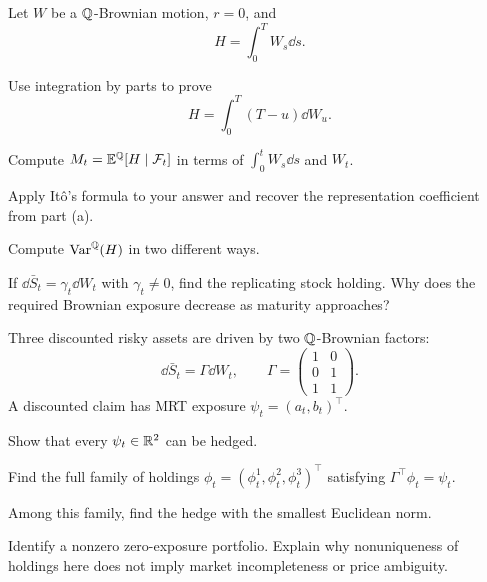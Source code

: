 \begin{exercise}
Let \(W\) be a \(\mathbb Q\)-Brownian motion, \(r=0\), and
\[
H=\int_0^T W_s\dd s.
\]
\begin{exparts}
  \item Use integration by parts to prove
  \[
  H=\int_0^T(T-u)\dd W_u.
  \]
  \item Compute \(M_t=\mathbb E^{\mathbb Q}[H\mid\mathcal F_t]\) in terms of
  \(\int_0^tW_s\dd s\) and \(W_t\).
  \item Apply It\^o's formula to your answer and recover the representation
  coefficient from part (a).
  \item Compute \(\operatorname{Var}^{\mathbb Q}(H)\) in two different ways.
  \item If \(\dd\bar S_t=\gamma_t\dd W_t\) with \(\gamma_t\neq0\), find the
  replicating stock holding. Why does the required Brownian exposure decrease as maturity
  approaches?
\end{exparts}
\end{exercise}

\begin{exercise}
Three discounted risky assets are driven by two \(\mathbb Q\)-Brownian factors:
\[
\dd\bar S_t=\Gamma\dd W_t,
\qquad
\Gamma=
\begin{pmatrix}
1&0\\
0&1\\
1&1
\end{pmatrix}.
\]
A discounted claim has MRT exposure
\(\psi_t=(a_t,b_t)^\top\).
\begin{exparts}
  \item Show that every \(\psi_t\in\mathbb{R}^2\) can be hedged.
  \item Find the full family of holdings
  \(\phi_t=(\phi_t^1,\phi_t^2,\phi_t^3)^\top\) satisfying
  \(\Gamma^\top\phi_t=\psi_t\).
  \item Among this family, find the hedge with the smallest Euclidean norm.
  \item Identify a nonzero zero-exposure portfolio. Explain why nonuniqueness
  of holdings here does not imply market incompleteness or price ambiguity.
\end{exparts}
\end{exercise}

